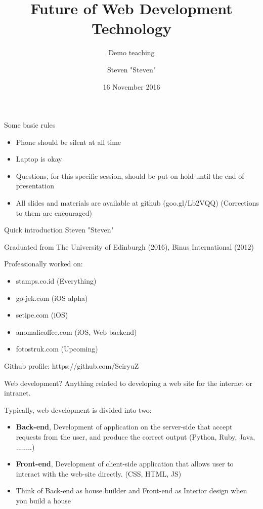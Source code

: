 \documentclass{beamer}
\title{Future of Web Development Technology}
\subtitle{Demo teaching}
\date{16 November 2016}
\author{Steven "Steven"}
\institute{BINUS INTERNATIONAL}
\begin{document}
  \maketitle
  
  \begin{frame}{Some basic rules}
  	\begin{itemize}
		\item Phone should be silent at all time
		\item Laptop is okay
		\item Questions, for this specific session, should be put on hold until the end of presentation
		\item All slides and materials are available at github (goo.gl/Lb2VQQ) (Corrections to them are encouraged)
	\end{itemize}
  \end{frame}
  
  \begin{frame}{Quick introduction}
	Steven "Steven"
	
	Graduated from The University of Edinburgh (2016), Binus International (2012)
	
	Professionally worked on:
	\begin{itemize}
		\item stamps.co.id  (Everything)
		\item go-jek.com (iOS alpha)
		\item setipe.com  (iOS)
		\item anomalicoffee.com (iOS, Web backend)
		\item fotostruk.com (Upcoming)
	\end{itemize}
	
	Github profile: https://github.com/SeiryuZ
  \end{frame}
  
    \begin{frame}{Web development?}
	Anything related to developing a web site for the internet or intranet.
	
	\pause
	Typically, web development is divided into two:
	
	\pause
	\begin{itemize}[<+->]
		\item \textbf{Back-end}, Development of application on the server-side that accept requests from the user, and produce the correct output (Python, Ruby, Java, ........)  
		
		\item \textbf{Front-end}, Development of client-side application that allows user to interact with the web-site directly. (CSS, HTML, JS)
		
		\item Think of Back-end as house builder and Front-end as Interior design when you build a house
	\end{itemize}
    \end{frame}
\end{document}
